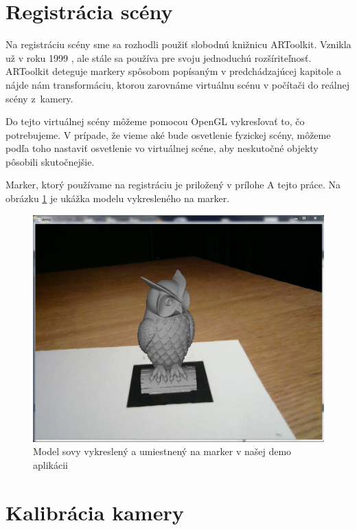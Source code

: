 \section{Registrácia scény}

Na registráciu scény sme sa rozhodli použiť slobodnú knižnicu ARToolkit. Vznikla už v roku 1999 \cite{ARToolKit-b}, ale stále sa používa pre svoju jednoduchú rozšíriteľnosť. ARToolkit deteguje markery spôsobom popísaným v predchádzajúcej kapitole a nájde nám transformáciu, ktorou zarovnáme virtuálnu scénu v počítači do reálnej scény z~kamery.

Do tejto virtuálnej scény môžeme pomocou OpenGL vykresľovať to, čo potrebujeme. V prípade, že vieme aké bude osvetlenie fyzickej scény, môžeme podľa toho nastaviť osvetlenie vo virtuálnej scéne, aby neskutočné objekty pôsobili skutočnejšie.

Marker, ktorý používame na registráciu je priložený v prílohe A tejto práce. Na obrázku \ref{sova-marker} je ukážka modelu vykresleného na marker.

\begin{figure}[h]
 \centering
 \includegraphics[max width=\textwidth]{pictures/screenshot-object.png}
 \caption{Model sovy vykreslený a umiestnený na marker v našej demo aplikácii}
 \label{sova-marker}
 \end{figure}

\section{Kalibrácia kamery}

